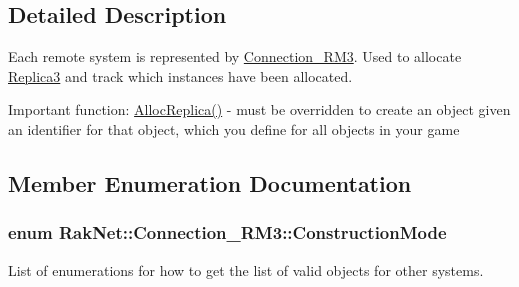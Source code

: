 \subsection{Detailed Description}
Each remote system is represented by \hyperlink{class_rak_net_1_1_connection___r_m3}{Connection\-\_\-\-R\-M3}. Used to allocate \hyperlink{class_rak_net_1_1_replica3}{Replica3} and track which instances have been allocated. 

Important function\-: \hyperlink{class_rak_net_1_1_connection___r_m3_ab05d85100f726378f2ed73c6792a5b46}{Alloc\-Replica()} -\/ must be overridden to create an object given an identifier for that object, which you define for all objects in your game 

\subsection{Member Enumeration Documentation}
\hypertarget{class_rak_net_1_1_connection___r_m3_a1d176e2d5c47c15ca341d8efaecb637e}{
\subsubsection[{Construction\-Mode}]{\setlength{\rightskip}{0pt plus 5cm}enum {\bf Rak\-Net\-::\-Connection\-\_\-\-R\-M3\-::\-Construction\-Mode}}}\label{class_rak_net_1_1_connection___r_m3_a1d176e2d5c47c15ca341d8efaecb637e}


List of enumerations for how to get the list of valid objects for other systems. 

